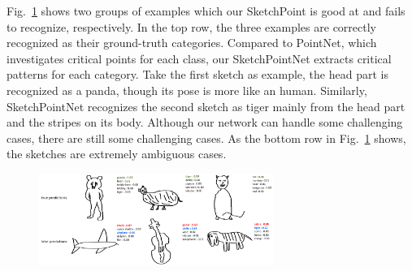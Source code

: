 Fig.~\ref{fig:resshow} shows two groups of examples which our SketchPoint is good at and fails to recognize, respectively. 
In the top row, the three examples are correctly recognized as their ground-truth categories.
Compared to PointNet, which investigates critical points for each class, our SketchPointNet extracts critical patterns for each category.
% 
Take the first sketch as example, the head part is recognized as a panda, though its pose is more like an human. Similarly, SketchPointNet recognizes the second sketch as tiger mainly from the head part and the stripes on its body. 
%
Although our network can handle some challenging cases, there are still some challenging cases. 
As the bottom row in Fig.~\ref{fig:resshow} shows, the sketches are extremely ambiguous cases.

\begin{figure}[htbp]
    \center
    \includegraphics[width=3in]{images/res.png}
    \label{fig:resshow}
\end{figure}
